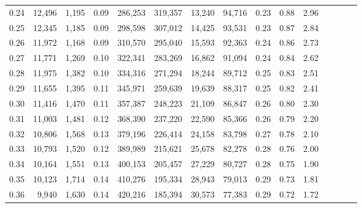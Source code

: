 \begin{tabular}{rrrcrrrrrrrrrrr}
0.24 &  12,496 &  1,195 &                                       0.09 &  286,253 &  319,357 &   13,240 &   94,716 &  0.23 &  0.88 &                         2.96 \\
0.25 &  12,345 &  1,185 &                                       0.09 &  298,598 &  307,012 &   14,425 &   93,531 &  0.23 &  0.87 &                         2.84 \\
0.26 &  11,972 &  1,168 &                                       0.09 &  310,570 &  295,040 &   15,593 &   92,363 &  0.24 &  0.86 &                         2.73 \\
0.27 &  11,771 &  1,269 &                                       0.10 &  322,341 &  283,269 &   16,862 &   91,094 &  0.24 &  0.84 &                         2.62 \\
0.28 &  11,975 &  1,382 &                                       0.10 &  334,316 &  271,294 &   18,244 &   89,712 &  0.25 &  0.83 &                         2.51 \\
0.29 &  11,655 &  1,395 &                                       0.11 &  345,971 &  259,639 &   19,639 &   88,317 &  0.25 &  0.82 &                         2.41 \\
0.30 &  11,416 &  1,470 &                                       0.11 &  357,387 &  248,223 &   21,109 &   86,847 &  0.26 &  0.80 &                         2.30 \\
0.31 &  11,003 &  1,481 &                                       0.12 &  368,390 &  237,220 &   22,590 &   85,366 &  0.26 &  0.79 &                         2.20 \\
0.32 &  10,806 &  1,568 &                                       0.13 &  379,196 &  226,414 &   24,158 &   83,798 &  0.27 &  0.78 &                         2.10 \\
0.33 &  10,793 &  1,520 &                                       0.12 &  389,989 &  215,621 &   25,678 &   82,278 &  0.28 &  0.76 &                         2.00 \\
0.34 &  10,164 &  1,551 &                                       0.13 &  400,153 &  205,457 &   27,229 &   80,727 &  0.28 &  0.75 &                         1.90 \\
0.35 &  10,123 &  1,714 &                                       0.14 &  410,276 &  195,334 &   28,943 &   79,013 &  0.29 &  0.73 &                         1.81 \\
0.36 &   9,940 &  1,630 &                                       0.14 &  420,216 &  185,394 &   30,573 &   77,383 &  0.29 &  0.72 &                         1.72 \\

\end{tabular}
